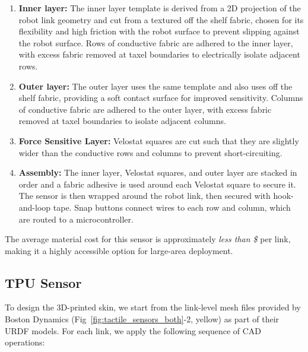 \begin{enumerate}[leftmargin=*]
\item \textbf{Inner layer:} The inner layer template is derived from a 2D projection of the robot link geometry and cut from a textured off the shelf fabric, chosen for its flexibility and high friction with the robot surface to prevent slipping against the robot surface. Rows of conductive fabric are adhered to the inner layer, with excess fabric removed at taxel boundaries to electrically isolate adjacent rows.
\item \textbf{Outer layer:} The outer layer uses the same template and also uses off the shelf fabric, providing a soft contact surface for improved sensitivity. Columns of conductive fabric are adhered to the outer layer, with excess fabric removed at taxel boundaries to isolate adjacent columns.
\item \textbf{Force Sensitive Layer:} Velostat squares are cut such that they are slightly wider than the conductive rows and columns to prevent short-circuiting. 
\item \textbf{Assembly:} The inner layer, Velostat squares, and outer layer are stacked in order and a fabric adhesive is used around each Velostat square to secure it. The sensor is then wrapped around the robot link, then secured with hook-and-loop tape. Snap buttons connect wires to each row and column, which are routed to a microcontroller.
\end{enumerate}
The average material cost for this sensor is approximately \textit{less than \$} per link, making it a highly accessible option for large-area deployment.

\subsection{TPU Sensor}
To design the 3D-printed skin, we start from the link-level mesh files provided by Boston Dynamics (Fig~\ref{fig:tactile_sensors_both}-2, yellow) as part of their URDF models. For each link, we apply the following sequence of CAD operations:

